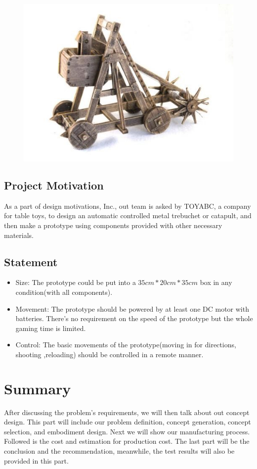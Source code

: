 \documentclass{article}
\begin{document}
\begin{figure}[H]
\centering
\includegraphics[width=0.6\linewidth]{treb}
\end{figure}
\subsection{Project Motivation}
As a part of design motivations, Inc., out team is asked by TOYABC, a company for table toys, to design an automatic controlled metal trebuchet or catapult, and then make a prototype using components provided with other necessary materials.
\subsection{Statement}
\begin{itemize}
\item Size: The prototype could be put into a $35cm*20cm*35cm$ box in any condition(with all components).
\item Movement: The prototype should be powered by at least one DC motor with batteries. There's no requirement on the speed of the prototype but the whole gaming time is limited.
\item Control: The basic movements of the prototype(moving in for directions, shooting ,reloading) should be controlled in a remote manner.
\end{itemize}
\section{Summary}
After discussing the problem’s requirements, we will then talk about out concept design. This part will include our problem definition, concept generation, concept selection, and embodiment design. Next we will show our manufacturing process. Followed is the cost and estimation for production cost. The last part will be the conclusion and the recommendation, meanwhile, the test results will also be provided in this part.
\end{document}
